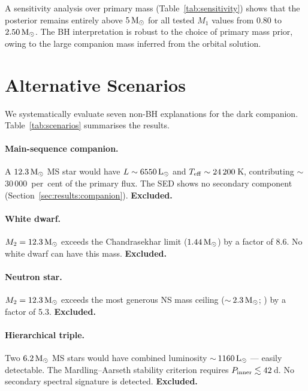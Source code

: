 \documentclass[usenatbib,fleqn]{mnras}
\newcommand{\Msun}{{\rm M}_\odot}
\newcommand{\Lsun}{{\rm L}_\odot}
\begin{document}
A sensitivity analysis over primary mass (Table~\ref{tab:sensitivity})
shows that the posterior remains entirely above $5\,\Msun$ for all
tested $M_1$ values from $0.80$ to $2.50\,\Msun$.  The BH
interpretation is robust to the choice of primary mass prior,
owing to the large companion mass inferred from the orbital
solution.

\section{Alternative Scenarios}
\label{sec:alternatives}

We systematically evaluate seven non-BH explanations for the dark
companion.  Table~\ref{tab:scenarios} summarises the results.

\paragraph{Main-sequence companion.}
A $12.3\,\Msun$ MS star would have $L \sim 6550\,\Lsun$ and
$T_{\rm eff} \sim 24\,200$\,K, contributing $\sim$30\,000~per~cent
of the primary flux.  The SED shows no secondary component
(Section~\ref{sec:results:companion}).  \textbf{Excluded.}

\paragraph{White dwarf.}
$M_2 = 12.3\,\Msun$ exceeds the Chandrasekhar limit
($1.44\,\Msun$) by a factor of 8.6.  No white dwarf can have
this mass.  \textbf{Excluded.}

\paragraph{Neutron star.}
$M_2 = 12.3\,\Msun$ exceeds the most generous NS mass ceiling
($\sim$\,$2.3\,\Msun$; \citealt{Rezzolla2018}) by a factor of
5.3.  \textbf{Excluded.}

\paragraph{Hierarchical triple.}
Two $6.2\,\Msun$ MS stars would have combined luminosity
$\sim$\,$1160\,\Lsun$ --- easily detectable.  The Mardling--Aarseth
stability criterion \citep{MardlingAarseth2001} requires
$P_{\rm inner} \lesssim 42$\,d.  No secondary spectral signature
is detected.  \textbf{Excluded.}
\end{document}
